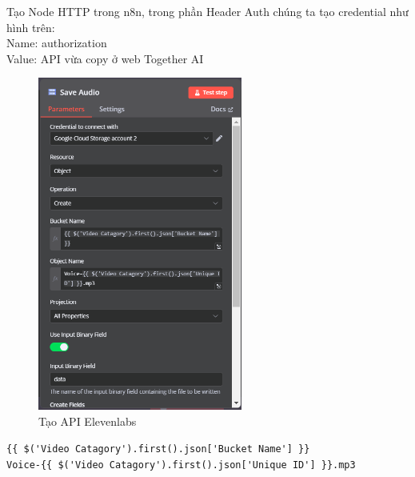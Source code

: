 \begin{itemize}[label=]
 Tạo Node HTTP trong n8n, trong phần Header Auth chúng ta tạo credential như hình trên:\\
 Name: authorization\\
 Value: API vừa copy ở web Together AI\\
     \begin{figure}[H]
    \centering
    \includegraphics[width=0.6\textwidth]{images/GGcloud-17.png}
    \caption{Tạo API Elevenlabs}
    
    \end{figure}
       \verb|{{ $('Video Catagory').first().json['Bucket Name'] }}|\\
    \verb|Voice-{{ $('Video Catagory').first().json['Unique ID'] }}.mp3|

\end{itemize}


